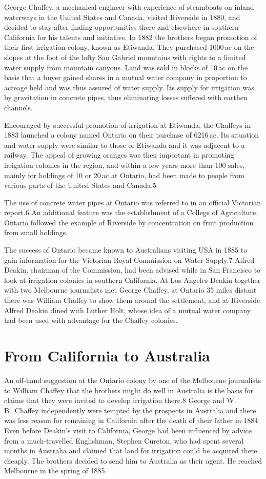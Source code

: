 George Chaffey, a mechanical engineer with experience of steamboats on
inland waterways in the United States and Canada, visited Riverside in
1880, and decided to stay after finding opportunities there and
elsewhere in southern California for his talents and initiative.  In
1882 the brothers began promotion of their first irrigation colony,
known as Etiwanda.  They purchased 1000\,ac on the slopes at the foot
of the lofty San Gabriel mountains with rights to a limited water
supply from mountain canyons.  Land was sold in blocks of 10\,ac on
the basis that a buyer gained shares in a mutual water company in
proportion to acreage held and was thus assured of water supply.  Its
supply for irrigation was by gravitation in concrete pipes, thus
eliminating losses suffered with earthen channels.

Encouraged by successful promotion of irrigation at Etiwanda, the
Chaffeys in 1883 launched a colony named Ontario on their purchase of
6216\,ac.  Its situation and water supply were similar to those of
Etiwanda and it was adjacent to a railway.  The appeal of growing
oranges was then important in promoting irrigation colonies in the
region, and within a few years more than 100 sales, mainly for
holdings of 10 or 20\,ac at Ontario, had been made to people from
various parts of the United States and Canada.5

The use of concrete water pipes at Ontario was referred to in an
official Victorian report.6 An additional feature was the
establishment of a College of Agriculture.  Ontario followed the
example of Riverside by concentration on fruit production from small
holdings.

The success of Ontario became known to Australians visiting USA in
1885 to gain information for the Victorian Royal Commission on Water
Supply.7 Alfred Deakin, chairman of the Commission, had been advised
while in San Francisco to look at irrigation colonies in southern
California.  At Los Angeles Deakin together with two Melbourne
journalists met George Chaffey, at Ontario 35 miles distant there was
William Chaffey to show them around the settlement, and at Riverside
Alfred Deakin dined with Luther Holt, whose idea of a mutual water
company had been used with advantage for the Chaffey colonies.

\section{From California to Australia}

An off-hand suggestion at the Ontario colony by one of the Melbourne
journalists to William Chaffey that the brothers might do well in
Australia is the basis for claims that they were invited to develop
irrigation there.8 George and W.\,B.~Chaffey independently were
tempted by the prospects in Australia and there was less reason for
remaining in California after the death of their father in 1884.  Even
before Deakin's visit to California, George had been influenced by
advice from a much-travelled Englishman, Stephen Cureton, who had
spent several months in Australia and claimed that land for irrigation
could be acquired there cheaply.  The brothers decided to send him to
Australia as their agent.  He reached Melbourne in the spring of 1885.

